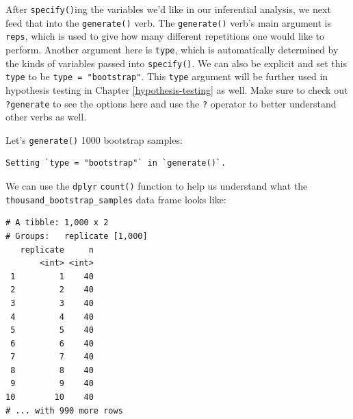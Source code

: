 \documentclass[12pt, krantz2,]{krantz}
\makeatletter
\newenvironment{Shaded}{\begin{snugshade}}{\end{snugshade}}
\newcommand{\DataTypeTok}[1]{\textcolor[rgb]{0.27,0.27,0.27}{#1}}
\newcommand{\DecValTok}[1]{\textcolor[rgb]{0.06,0.06,0.06}{#1}}
\newcommand{\KeywordTok}[1]{\textcolor[rgb]{0.27,0.27,0.27}{\textbf{#1}}}
\newcommand{\NormalTok}[1]{#1}
\newcommand{\OperatorTok}[1]{\textcolor[rgb]{0.43,0.43,0.43}{\textbf{#1}}}
\newcommand{\StringTok}[1]{\textcolor[rgb]{0.5,0.5,0.5}{#1}}
\newenvironment{kframe}{%
\medskip{}
\setlength{\fboxsep}{.8em}
 \def\at@end@of@kframe{}%
 \ifinner\ifhmode%
  \def\at@end@of@kframe{\end{minipage}}%
  \begin{minipage}{\columnwidth}%
 \fi\fi%
 \def\FrameCommand##1{\hskip\@totalleftmargin \hskip-\fboxsep
 \colorbox{shadecolor}{##1}\hskip-\fboxsep
     \hskip-\linewidth \hskip-\@totalleftmargin \hskip\columnwidth}%
 \MakeFramed {\advance\hsize-\width
   \@totalleftmargin\z@ \linewidth\hsize
   \@setminipage}}%
 {\par\unskip\endMakeFramed%
 \at@end@of@kframe}
\renewenvironment{Shaded}{\begin{kframe}}{\end{kframe}}
\makeatother
\begin{document}
After \texttt{specify()}ing the variables we'd like in our inferential analysis, we next feed that into the \texttt{generate()} verb. The \texttt{generate()} verb's main argument is \texttt{reps}, which is used to give how many different repetitions one would like to perform. Another argument here is \texttt{type}, which is automatically determined by the kinds of variables passed into \texttt{specify()}. We can also be explicit and set this \texttt{type} to be \texttt{type\ =\ "bootstrap"}. This \texttt{type} argument will be further used in hypothesis testing in Chapter \ref{hypothesis-testing} as well. Make sure to check out \texttt{?generate} to see the options here and use the \texttt{?} operator to better understand other verbs as well.

Let's \texttt{generate()} 1000 bootstrap samples:

\begin{Shaded}
\end{Shaded}

\begin{verbatim}
Setting `type = "bootstrap"` in `generate()`.
\end{verbatim}

We can use the \texttt{dplyr} \texttt{count()} function to help us understand what the \texttt{thousand\_bootstrap\_samples} data frame looks like:

\begin{Shaded}
\end{Shaded}

\begin{verbatim}
# A tibble: 1,000 x 2
# Groups:   replicate [1,000]
   replicate     n
       <int> <int>
 1         1    40
 2         2    40
 3         3    40
 4         4    40
 5         5    40
 6         6    40
 7         7    40
 8         8    40
 9         9    40
10        10    40
# ... with 990 more rows
\end{verbatim}
\end{document}
